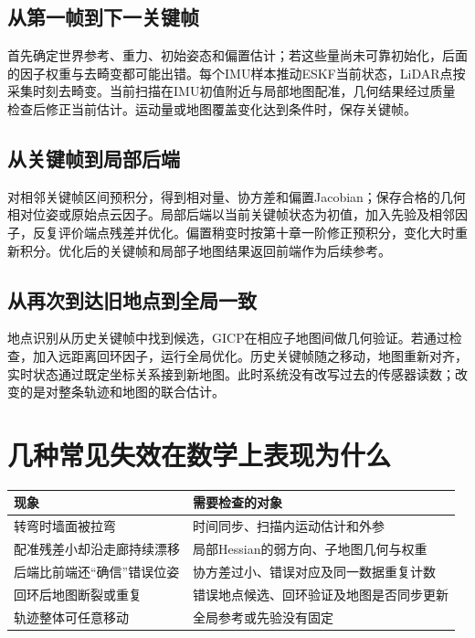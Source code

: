 \subsection{从第一帧到下一关键帧}

首先确定世界参考、重力、初始姿态和偏置估计；若这些量尚未可靠初始化，后面的因子权重与去畸变都可能出错。每个IMU样本推动ESKF当前状态，LiDAR点按采集时刻去畸变。当前扫描在IMU初值附近与局部地图配准，几何结果经过质量检查后修正当前估计。运动量或地图覆盖变化达到条件时，保存关键帧。

\subsection{从关键帧到局部后端}

对相邻关键帧区间预积分，得到相对量、协方差和偏置Jacobian；保存合格的几何相对位姿或原始点云因子。局部后端以当前关键帧状态为初值，加入先验及相邻因子，反复评价端点残差并优化。偏置稍变时按第十章一阶修正预积分，变化大时重新积分。优化后的关键帧和局部子地图结果返回前端作为后续参考。

\subsection{从再次到达旧地点到全局一致}

地点识别从历史关键帧中找到候选，GICP在相应子地图间做几何验证。若通过检查，加入远距离回环因子，运行全局优化。历史关键帧随之移动，地图重新对齐，实时状态通过既定坐标关系接到新地图。此时系统没有改写过去的传感器读数；改变的是对整条轨迹和地图的联合估计。

\section{几种常见失效在数学上表现为什么}

\begin{center}\small\begin{tabular}{p{}p{}}\toprule

现象 & 需要检查的对象 \\

\midrule

转弯时墙面被拉弯 & 时间同步、扫描内运动估计和外参 \\

配准残差小却沿走廊持续漂移 & 局部Hessian的弱方向、子地图几何与权重 \\

后端比前端还“确信”错误位姿 & 协方差过小、错误对应及同一数据重复计数 \\

回环后地图断裂或重复 & 错误地点候选、回环验证及地图是否同步更新 \\

轨迹整体可任意移动 & 全局参考或先验没有固定 \\

\bottomrule\end{tabular}\end{center}

